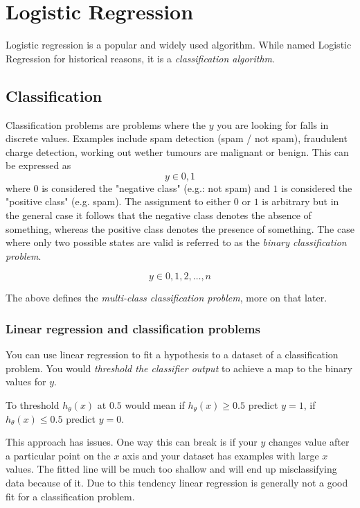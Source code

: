
\chapter{Logistic Regression}
Logistic regression is a popular and widely used algorithm. While named Logistic Regression for historical reasons, it is a \emph{classification algorithm}.

\section{Classification}
Classification problems are problems where the $y$ you are looking for falls in discrete values. Examples include spam detection (spam / not spam), fraudulent charge detection, working out wether tumours are malignant or benign. This can be expressed as
\[y \in {0, 1}\]
where $0$ is considered the "negative class" (e.g.: not spam) and $1$ is considered the "positive class" (e.g. spam). The assignment to either $0$ or $1$ is arbitrary but in the general case it follows that the negative class denotes the absence of something, whereas the positive class denotes the presence of something.
The case where only two possible states are valid is referred to as the \emph{binary classification problem}.

\[ y \in {0, 1, 2, \dotsc, n} \]

The above defines the \emph{multi-class classification problem}, more on that later.

\subsection{Linear regression and classification problems}

You can use linear regression to fit a hypothesis to a dataset of a classification problem. You would \emph{threshold the classifier output} to achieve a map to the binary values for $y$.

To threshold $h_\theta(x)$ at $0.5$ would mean if  $h_\theta(x) \ge 0.5$ predict $y=1$, if $h_\theta(x) \leq 0.5$ predict $y=0$.

This approach has issues. One way this can break is if your $y$ changes value after a particular point on the $x$ axis and your dataset has examples with large $x$ values. The fitted line will be much too shallow and will end up misclassifying data because of it. Due to this tendency linear regression is generally not a good fit for a classification problem.

